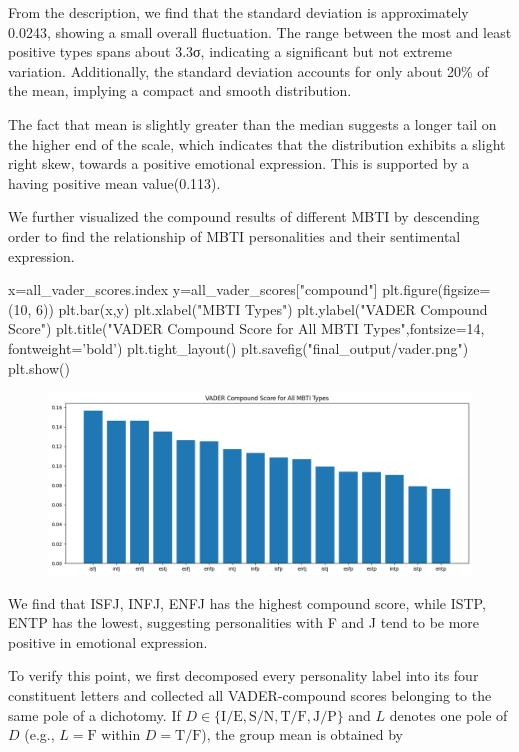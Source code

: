 \documentclass[12pt]{article}
\begin{document}
	From the description, we find that the standard deviation is approximately 0.0243, showing a small overall fluctuation. The range between the most and least positive types spans about 3.3σ, indicating a significant but not extreme variation. Additionally, the standard deviation accounts for only about 20\% of the mean, implying a compact and smooth distribution.
	
	The fact that mean is slightly greater than the median suggests a longer tail on the higher end of the scale, which indicates that the distribution exhibits a slight right skew, towards a positive emotional expression. This is supported by a having positive mean value(0.113).
	
	We further visualized the compound results of different MBTI by descending order to find the relationship of MBTI personalities and their sentimental expression.
	
	\begin{python}
x=all_vader_scores.index
y=all_vader_scores["compound"]
plt.figure(figsize=(10, 6))
plt.bar(x,y)
plt.xlabel("MBTI Types")
plt.ylabel("VADER Compound Score")
plt.title("VADER Compound Score for All MBTI Types",fontsize=14, fontweight='bold')
plt.tight_layout()
plt.savefig("final_output/vader.png")
plt.show()
	\end{python}
	\begin{figure}[H]
			\centering
			\includegraphics[width=1\textwidth]{Q2VADERa1} 
			\caption{\centering }		
	\end{figure}
	
	We find that ISFJ, INFJ, ENFJ has the highest compound score, while ISTP, ENTP has the lowest, suggesting personalities with F and J tend to be more positive in emotional expression.
	
	To verify this point, we first decomposed every personality label into its four constituent letters and collected all VADER-compound scores belonging to the same pole of a dichotomy.  If $D\in\{\text{I/E},\text{S/N},\text{T/F},\text{J/P}\}$ and $L$ denotes one pole of $D$ (e.g., $L=\text{F}$ within $D=\text{T/F}$), the group mean is obtained by
	
\end{document}
